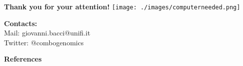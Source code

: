 \documentclass[10pt]{beamer}
\begin{document}
\begin{frame}
	\begin{center}
		\textbf{\Large{Thank you for your attention!}}
		\texttt{[image: ./images/computerneeded.png]}	
	\end{center}
	\let\thefootnote\relax\small{\textbf{Contacts:}\\ Mail: giovanni.bacci@unifi.it \\ Twitter: @combogenomics}
\end{frame}

\begin{frame}[allowframebreaks, t]
	\vspace{2mm}
	\textbf{\Large{References}}
	\vspace{2mm}	
	\tiny
	
\end{frame}
\end{document}
